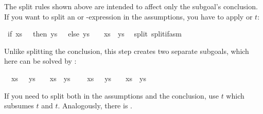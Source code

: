 \begin{isabellebody}
\begin{isamarkuptext}
The split rules shown above are intended to affect only the subgoal's
conclusion.  If you want to split an  or -expression
in the assumptions, you have to apply  or
$t$:%
\end{isamarkuptext}%
\isamarkuptrue%
\isamarkupfalse%
\ {\isachardoublequoteopen}if\ xs\ {\isacharequal}\ {\isacharbrackleft}{\isacharbrackright}\ then\ ys\ {\isasymnoteq}\ {\isacharbrackleft}{\isacharbrackright}\ else\ ys\ {\isacharequal}\ {\isacharbrackleft}{\isacharbrackright}\ {\isasymLongrightarrow}\ xs\ {\isacharat}\ ys\ {\isasymnoteq}\ {\isacharbrackleft}{\isacharbrackright}{\isachardoublequoteclose}\isanewline
%
\isadelimproof
%
\endisadelimproof
%
\isatagproof
{}\isamarkupfalse%
{\isacharparenleft}split\ split{\isacharunderscore}if{\isacharunderscore}asm{\isacharparenright}%
\begin{isamarkuptxt}%
\noindent
Unlike splitting the conclusion, this step creates two
separate subgoals, which here can be solved by :
\begin{isabelle}%
\ {}{\isachardot}\ {\isasymlbrakk}xs\ {\isacharequal}\ {\isacharbrackleft}{\isacharbrackright}{\isacharsemicolon}\ ys\ {\isasymnoteq}\ {\isacharbrackleft}{\isacharbrackright}{\isasymrbrakk}\ {\isasymLongrightarrow}\ xs\ {\isacharat}\ ys\ {\isasymnoteq}\ {\isacharbrackleft}{\isacharbrackright}\isanewline
\ {}{\isachardot}\ {\isasymlbrakk}xs\ {\isasymnoteq}\ {\isacharbrackleft}{\isacharbrackright}{\isacharsemicolon}\ ys\ {\isacharequal}\ {\isacharbrackleft}{\isacharbrackright}{\isasymrbrakk}\ {\isasymLongrightarrow}\ xs\ {\isacharat}\ ys\ {\isasymnoteq}\ {\isacharbrackleft}{\isacharbrackright}%
\end{isabelle}
If you need to split both in the assumptions and the conclusion,
use $t$ which subsumes $t$ and
$t$. Analogously, there is .


\end{isamarkuptxt}
\end{isabellebody}
